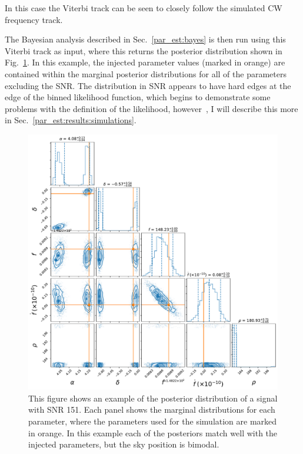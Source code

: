 %
In this case the Viterbi track can be seen to closely follow the simulated
\gls{CW} frequency track.

The Bayesian analysis described in Sec.~\ref{par_est:bayes} is then run using
this Viterbi track as input, where this returns the posterior distribution
shown in Fig.~\ref{par_est:results:example_posterior}.  In this example, the
injected parameter values (marked in orange) are contained within the marginal
posterior distributions for all of the parameters excluding the \gls{SNR}.  The
distribution in \gls{SNR} appears to have hard edges at the edge of the binned
likelihood function, which begins to demonstrate some problems with the
definition of the likelihood, however~, I
will describe this more in Sec.~\ref{par_est:results:simulations}.
%
\begin{figure}[pt]
    \centering
    \includegraphics[width=\linewidth]{C5_parameter/cornerplot.pdf}
    \caption[KDE of likelihood in different \gls{SNR} ranges]{This figure shows
an example of the posterior distribution of a signal with \gls{SNR} 151. Each
panel shows the marginal distributions for each parameter, where the parameters
used for the simulation are marked in orange. In this example each of the
posteriors match well with the injected parameters, but the sky position is
bimodal.~}
\label{par_est:results:example_posterior}    
\end{figure}
%

